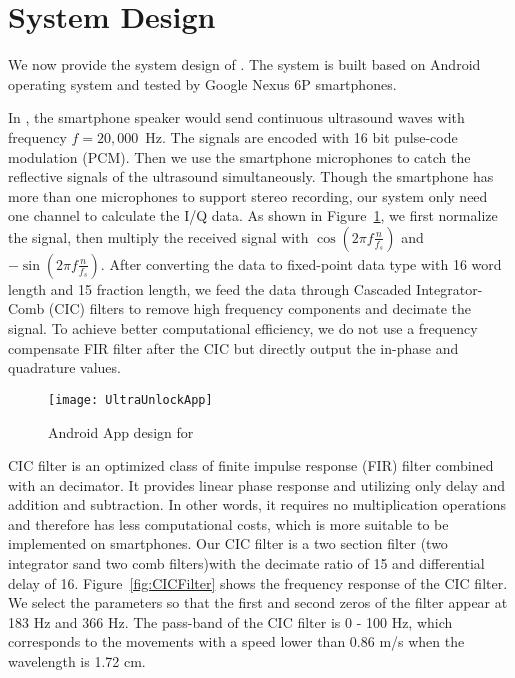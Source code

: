 \section{System Design}
We now provide the system design of {\uu}. The system is built based on Android operating system and tested by Google Nexus 6P smartphones.

In {\uu}, the smartphone speaker would send continuous ultrasound waves with frequency $f = 20,000 $~Hz. The signals are encoded with 16 bit pulse-code modulation (PCM). Then we use the smartphone microphones to catch the reflective signals of the ultrasound simultaneously. Though the smartphone has more than one microphones to support stereo recording, our system only need one channel to calculate the I/Q data.  As shown in Figure~\ref{fig:ultraunlockapp}, we first normalize the signal, then multiply the received signal with $\cos \left (2\pi f \frac{n}{f_s}\right)$ and $-\sin \left (2\pi f \frac{n}{f_s}\right)$. After converting the data to fixed-point data type with 16 word length and 15 fraction length, we feed the data through Cascaded Integrator-Comb (CIC) filters to remove high frequency components and decimate the signal. To achieve better computational efficiency, we do not use a frequency compensate FIR filter after the CIC but directly output the in-phase and quadrature values.



\begin{landscape}
	\begin{figure}[h]
		\centering
		\vspace{-1.7in}
		\texttt{[image: UltraUnlockApp]}
		\vspace{-1.5in}
		\caption{Android App design for {\uu}}
		\label{fig:ultraunlockapp}
	\end{figure}
\end{landscape}



CIC filter is an optimized class of finite impulse response (FIR) filter combined with an decimator. It provides linear phase response and 
utilizing only delay and addition and subtraction. In other words, it requires no multiplication operations and therefore has less computational costs, which is more suitable to be implemented on smartphones.
%
Our CIC filter is a two section filter (two integrator sand two comb filters)with the decimate ratio of 15 and differential delay of 16. Figure~\ref{fig:CICFilter} shows the frequency response of the CIC filter. We select the parameters so that the first and second zeros of the filter appear at 183 Hz and 366 Hz. The pass-band of the CIC filter is 0 - 100 Hz, which corresponds to the movements with a speed lower than 0.86 m/s when the wavelength is 1.72 cm. 

